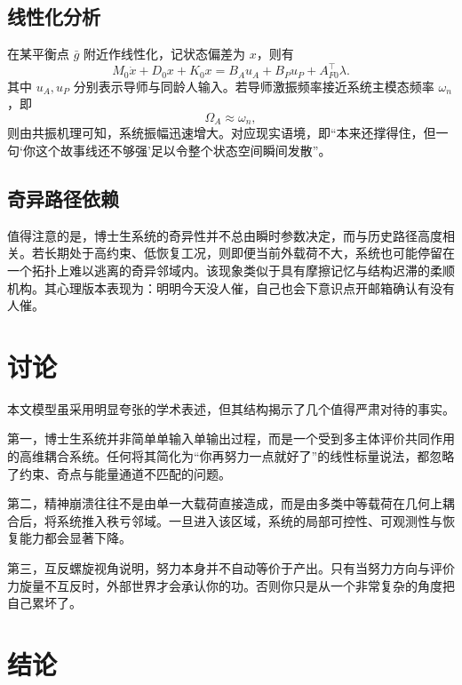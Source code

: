 \documentclass[UTF8,twocolumn,a4paper]{ctexart}
\begin{document}
\subsection{线性化分析}

在某平衡点 $\bar{g}$ 附近作线性化，记状态偏差为 $x$，则有
\begin{equation}
M_0\dot{x}+D_0x+K_0x = B_Au_A + B_Pu_P + A_{F0}^\top \lambda.
\label{eq:linear}
\end{equation}
其中 $u_A,u_P$ 分别表示导师与同龄人输入。若导师激振频率接近系统主模态频率 $\omega_n$，即
\begin{equation}
\Omega_A \approx \omega_n,
\end{equation}
则由共振机理可知，系统振幅迅速增大。对应现实语境，即“本来还撑得住，但一句‘你这个故事线还不够强’足以令整个状态空间瞬间发散”。

\subsection{奇异路径依赖}

值得注意的是，博士生系统的奇异性并不总由瞬时参数决定，而与历史路径高度相关。若长期处于高约束、低恢复工况，则即便当前外载荷不大，系统也可能停留在一个拓扑上难以逃离的奇异邻域内。该现象类似于具有摩擦记忆与结构迟滞的柔顺机构。其心理版本表现为：明明今天没人催，自己也会下意识点开邮箱确认有没有人催。

\section{讨论}

本文模型虽采用明显夸张的学术表述，但其结构揭示了几个值得严肃对待的事实。

第一，博士生系统并非简单单输入单输出过程，而是一个受到多主体评价共同作用的高维耦合系统。任何将其简化为“你再努力一点就好了”的线性标量说法，都忽略了约束、奇点与能量通道不匹配的问题。

第二，精神崩溃往往不是由单一大载荷直接造成，而是由多类中等载荷在几何上耦合后，将系统推入秩亏邻域。一旦进入该区域，系统的局部可控性、可观测性与恢复能力都会显著下降。

第三，互反螺旋视角说明，努力本身并不自动等价于产出。只有当努力方向与评价力旋量不互反时，外部世界才会承认你的功。否则你只是从一个非常复杂的角度把自己累坏了。

\section{结论}
\end{document}
